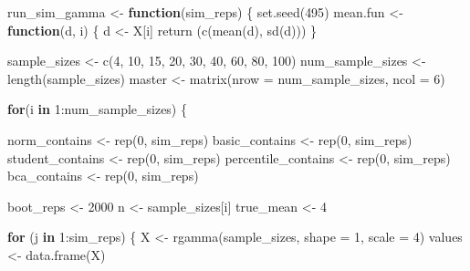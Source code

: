 \documentclass[12pt]{article}
\newenvironment{Shaded}{\begin{snugshade}}{\end{snugshade}}
\newcommand{\AttributeTok}[1]{\textcolor[rgb]{0.77,0.63,0.00}{#1}}
\newcommand{\ControlFlowTok}[1]{\textcolor[rgb]{0.13,0.29,0.53}{\textbf{#1}}}
\newcommand{\DecValTok}[1]{\textcolor[rgb]{0.00,0.00,0.81}{#1}}
\newcommand{\FunctionTok}[1]{\textcolor[rgb]{0.00,0.00,0.00}{#1}}
\newcommand{\NormalTok}[1]{#1}
\newcommand{\OtherTok}[1]{\textcolor[rgb]{0.56,0.35,0.01}{#1}}
\newcommand{\SpecialCharTok}[1]{\textcolor[rgb]{0.00,0.00,0.00}{#1}}
\begin{document}
\begin{Shaded}
\begin{Highlighting}[]
\NormalTok{run\_sim\_gamma }\OtherTok{\textless{}{-}} \ControlFlowTok{function}\NormalTok{(sim\_reps) \{}
  \FunctionTok{set.seed}\NormalTok{(}\DecValTok{495}\NormalTok{)}
\NormalTok{  mean.fun }\OtherTok{\textless{}{-}} \ControlFlowTok{function}\NormalTok{(d, i) \{}
\NormalTok{    d }\OtherTok{\textless{}{-}}\NormalTok{ X[i]}
    \FunctionTok{return}\NormalTok{ (}\FunctionTok{c}\NormalTok{(}\FunctionTok{mean}\NormalTok{(d), }\FunctionTok{sd}\NormalTok{(d)))}
\NormalTok{  \}}
  
\NormalTok{  sample\_sizes }\OtherTok{\textless{}{-}} \FunctionTok{c}\NormalTok{(}\DecValTok{4}\NormalTok{, }\DecValTok{10}\NormalTok{, }\DecValTok{15}\NormalTok{, }\DecValTok{20}\NormalTok{, }\DecValTok{30}\NormalTok{, }\DecValTok{40}\NormalTok{, }\DecValTok{60}\NormalTok{, }\DecValTok{80}\NormalTok{, }\DecValTok{100}\NormalTok{)}
\NormalTok{  num\_sample\_sizes }\OtherTok{\textless{}{-}} \FunctionTok{length}\NormalTok{(sample\_sizes)}
\NormalTok{  master }\OtherTok{\textless{}{-}} \FunctionTok{matrix}\NormalTok{(}\AttributeTok{nrow =}\NormalTok{ num\_sample\_sizes, }\AttributeTok{ncol =} \DecValTok{6}\NormalTok{)}
  
  \ControlFlowTok{for}\NormalTok{(i }\ControlFlowTok{in} \DecValTok{1}\SpecialCharTok{:}\NormalTok{num\_sample\_sizes) \{}
  
\NormalTok{    norm\_contains }\OtherTok{\textless{}{-}} \FunctionTok{rep}\NormalTok{(}\DecValTok{0}\NormalTok{, sim\_reps)}
\NormalTok{    basic\_contains }\OtherTok{\textless{}{-}} \FunctionTok{rep}\NormalTok{(}\DecValTok{0}\NormalTok{, sim\_reps)}
\NormalTok{    student\_contains }\OtherTok{\textless{}{-}} \FunctionTok{rep}\NormalTok{(}\DecValTok{0}\NormalTok{, sim\_reps)}
\NormalTok{    percentile\_contains }\OtherTok{\textless{}{-}} \FunctionTok{rep}\NormalTok{(}\DecValTok{0}\NormalTok{, sim\_reps)}
\NormalTok{    bca\_contains }\OtherTok{\textless{}{-}} \FunctionTok{rep}\NormalTok{(}\DecValTok{0}\NormalTok{, sim\_reps)}
    
\NormalTok{    boot\_reps }\OtherTok{\textless{}{-}} \DecValTok{2000}
\NormalTok{    n }\OtherTok{\textless{}{-}}\NormalTok{ sample\_sizes[i]}
\NormalTok{    true\_mean }\OtherTok{\textless{}{-}} \DecValTok{4}
    
    \ControlFlowTok{for}\NormalTok{ (j }\ControlFlowTok{in} \DecValTok{1}\SpecialCharTok{:}\NormalTok{sim\_reps) \{}
\NormalTok{      X }\OtherTok{\textless{}{-}} \FunctionTok{rgamma}\NormalTok{(sample\_sizes, }\AttributeTok{shape =} \DecValTok{1}\NormalTok{, }\AttributeTok{scale =} \DecValTok{4}\NormalTok{)}
\NormalTok{      values }\OtherTok{\textless{}{-}} \FunctionTok{data.frame}\NormalTok{(X)}
    

\end{Highlighting}
\end{Shaded}
\end{document}
